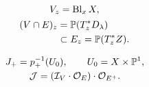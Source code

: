 \begin{minipage}[c]{0.48\linewidth}
\centering
\small
{}
\[
 \begin{gathered}
 V_z=\operatorname{Bl}_xX,\\
 \begin{aligned}
 (V\cap E)_z&=\mathbb P(T_z^*D_\lambda)\\
             &\subset E_z=\mathbb P(T_z^*Z).
 \end{aligned}
 \end{gathered}
\]
\end{minipage}
\hfill
\begin{minipage}[c]{0.48\linewidth}
\centering
\small
{}
\[
 \begin{gathered}
 J_+=p_+^{-1}(U_0),\qquad U_0=X\times\mathbb P^1,\\
 \mathcal J=(\mathcal I_V\cdot\mathcal O_E)\cdot\mathcal O_{E^+}.
 \end{gathered}
\]
\end{minipage}
